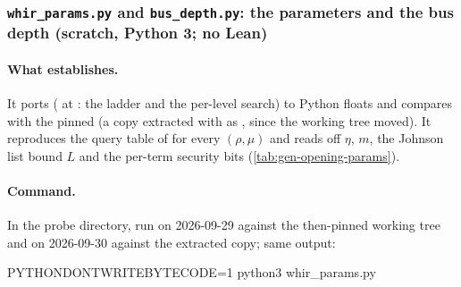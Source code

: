 \subsubsection{\texttt{whir\_params.py} and \texttt{bus\_depth.py}: the parameters and the bus depth (scratch, Python 3; no Lean)}\label{sec:gen-opening-probe-params}

\begin{sloppypar}
\paragraph{What  establishes.} It ports 
( at : the ladder and the per-level search) to
Python floats and compares with the pinned  (a copy extracted with
 as , since the working
tree moved). It reproduces the query table of  for every $(ρ, μ)$ and reads
off $η$, $m$, the Johnson list bound $L$ and the per-term security bits
(\cref{tab:gen-opening-params}).
\end{sloppypar}

\paragraph{Command.} In the probe directory, run on 2026-09-29 against the then-pinned working tree
and on 2026-09-30 against the extracted copy; same output:
\begin{shellcode}
PYTHONDONTWRITEBYTECODE=1 python3 whir_params.py
\end{shellcode}

